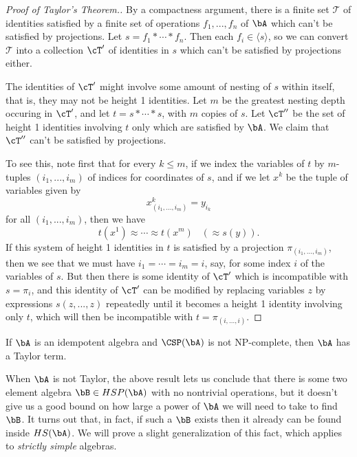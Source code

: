 \begin{proof}[Proof of Taylor's Theorem.] By a compactness argument, there is a finite set $\mathcal{T}$ of identities satisfied by a finite set of operations $f_1, ..., f_n$ of $\bA$ which can't be satisfied by projections. Let $s = f_1 * \cdots * f_n$. Then each $f_i \in \langle s \rangle$, so we can convert $\mathcal{T}$ into a collection $\cT'$ of identities in $s$ which can't be satisfied by projections either.

The identities of $\cT'$ might involve some amount of nesting of $s$ within itself, that is, they may not be height 1 identities. Let $m$ be the greatest nesting depth occuring in $\cT'$, and let $t = s * \cdots * s$, with $m$ copies of $s$. Let $\cT''$ be the set of height 1 identities involving $t$ only which are satisfied by $\bA$. We claim that $\cT''$ can't be satisfied by projections.

To see this, note first that for every $k \le m$, if we index the variables of $t$ by $m$-tuples $(i_1, ..., i_m)$ of indices for coordinates of $s$, and if we let $x^k$ be the tuple of variables given by
\[
x^k_{(i_1, ..., i_m)} = y_{i_k}
\]
for all $(i_1, ..., i_m)$, then we have
\[
t(x^1) \approx \cdots \approx t(x^m) \;\;\; (\approx s(y)).
\]
If this system of height 1 identities in $t$ is satisfied by a projection $\pi_{(i_1, ..., i_m)}$, then we see that we must have $i_1 = \cdots = i_m = i$, say, for some index $i$ of the variables of $s$. But then there is some identity of $\cT'$ which is incompatible with $s = \pi_i$, and this identity of $\cT'$ can be modified by replacing variables $z$ by expressions $s(z,...,z)$ repeatedly until it becomes a height 1 identity involving only $t$, which will then be incompatible with $t = \pi_{(i,...,i)}$.
\end{proof}

\begin{cor} If $\bA$ is an idempotent algebra and $\CSP(\bA)$ is not NP-complete, then $\bA$ has a Taylor term.
\end{cor}

When $\bA$ is not Taylor, the above result lets us conclude that there is some two element algebra $\bB \in HSP(\bA)$ with no nontrivial operations, but it doesn't give us a good bound on how large a power of $\bA$ we will need to take to find $\bB$. It turns out that, in fact, if such a $\bB$ exists then it already can be found inside $HS(\bA)$. We will prove a slight generalization of this fact, which applies to \emph{strictly simple} algebras.

